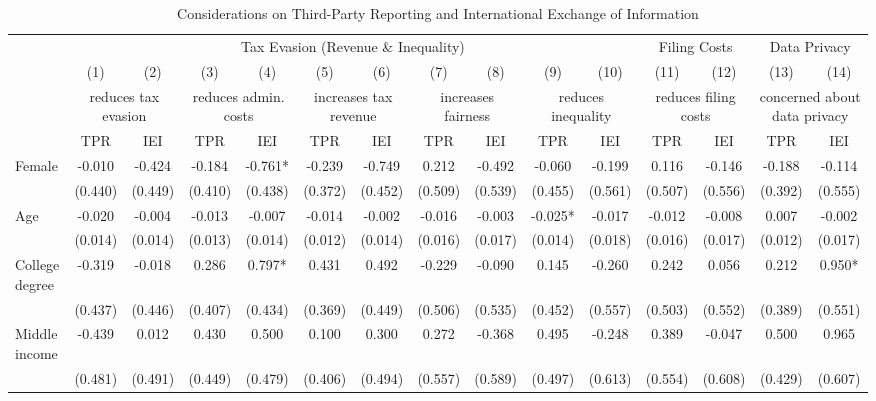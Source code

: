 \documentclass[11pt]{article}
\begin{document}
\begin{landscape}
\begin{table}[!htbp]\centering
\caption{Considerations on Third-Party Reporting and International Exchange of Information}
\label{tab:policyconsiderationstpr_c}
\begin{threeparttable}
\tiny
\begin{tabular}{l||cc|cc|cc|cc|cc||cc||cc}
\toprule
& \multicolumn{10}{c||}{Tax Evasion (Revenue \& Inequality)} & \multicolumn{2}{c||}{Filing Costs} & \multicolumn{2}{c}{Data Privacy} \\
& (1) & (2) & (3) & (4) & (5) & (6) & (7) & (8) & (9) & (10) & (11) & (12) & (13) & (14) \\[0.5em]
& \multicolumn{2}{c|}{reduces tax evasion} & \multicolumn{2}{c|}{reduces admin. costs} & \multicolumn{2}{c|}{increases tax revenue} & \multicolumn{2}{c|}{increases fairness} & \multicolumn{2}{c||}{reduces inequality} & \multicolumn{2}{c||}{reduces filing costs} & \multicolumn{2}{c}{concerned about data privacy} \\
& TPR & IEI & TPR & IEI & TPR & IEI & TPR & IEI & TPR & IEI & TPR & IEI & TPR & IEI \\
\midrule
Female & -0.010 & -0.424 & -0.184 & -0.761* & -0.239 & -0.749 & 0.212 & -0.492 & -0.060 & -0.199 & 0.116 & -0.146 & -0.188 & -0.114 \\
 & (0.440) & (0.449) & (0.410) & (0.438) & (0.372) & (0.452) & (0.509) & (0.539) & (0.455) & (0.561) & (0.507) & (0.556) & (0.392) & (0.555) \\
Age & -0.020 & -0.004 & -0.013 & -0.007 & -0.014 & -0.002 & -0.016 & -0.003 & -0.025* & -0.017 & -0.012 & -0.008 & 0.007 & -0.002 \\
 & (0.014) & (0.014) & (0.013) & (0.014) & (0.012) & (0.014) & (0.016) & (0.017) & (0.014) & (0.018) & (0.016) & (0.017) & (0.012) & (0.017) \\
College degree & -0.319 & -0.018 & 0.286 & 0.797* & 0.431 & 0.492 & -0.229 & -0.090 & 0.145 & -0.260 & 0.242 & 0.056 & 0.212 & 0.950* \\
 & (0.437) & (0.446) & (0.407) & (0.434) & (0.369) & (0.449) & (0.506) & (0.535) & (0.452) & (0.557) & (0.503) & (0.552) & (0.389) & (0.551) \\
Middle income & -0.439 & 0.012 & 0.430 & 0.500 & 0.100 & 0.300 & 0.272 & -0.368 & 0.495 & -0.248 & 0.389 & -0.047 & 0.500 & 0.965 \\
 & (0.481) & (0.491) & (0.449) & (0.479) & (0.406) & (0.494) & (0.557) & (0.589) & (0.497) & (0.613) & (0.554) & (0.608) & (0.429) & (0.607) \\

\end{tabular}
\end{threeparttable}
\end{table}
\end{landscape}
\end{document}
